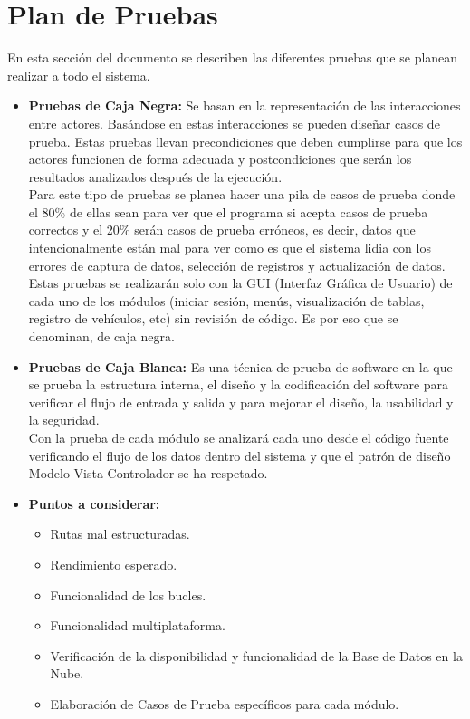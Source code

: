 \section{Plan de Pruebas}
En esta sección del documento se describen las diferentes pruebas que se planean realizar a todo el sistema.
\begin{itemize}
	\item \textbf{Pruebas de Caja Negra: } Se basan en la representación de las interacciones entre actores. Basándose en estas interacciones se pueden diseñar casos de prueba. Estas pruebas llevan precondiciones que deben cumplirse para que los actores funcionen de forma adecuada y postcondiciones que serán los resultados analizados después de la ejecución. \\
	Para este tipo de pruebas se planea hacer una pila de casos de prueba donde el 80\% de ellas sean para ver que el programa si acepta casos de prueba correctos y el 20\% serán casos de prueba erróneos, es decir, datos que intencionalmente están mal para ver como es que el sistema lidia con los errores de captura de datos, selección de registros y actualización de datos. Estas pruebas se realizarán solo con la GUI (Interfaz Gráfica de Usuario) de cada uno de los módulos (iniciar sesión, menús, visualización de tablas, registro de vehículos, etc) sin revisión de código. Es por eso que se denominan, de caja negra. 
	\item \textbf{Pruebas de Caja Blanca: } Es una técnica de prueba de software en la que se prueba la estructura interna, el diseño y la codificación del software para verificar el flujo de entrada y salida y para mejorar el diseño, la usabilidad y la seguridad. \\
	Con la prueba de cada módulo se analizará cada uno desde el código fuente verificando el flujo de los datos dentro del sistema y que el patrón de diseño Modelo Vista Controlador se ha respetado.
	\item \textbf{Puntos a considerar: }
	\begin{itemize}
		\item Rutas mal estructuradas.
		\item Rendimiento esperado.
		\item Funcionalidad de los bucles.
		\item Funcionalidad multiplataforma.
		\item Verificación de la disponibilidad y funcionalidad de la Base de Datos en la Nube.
		\item Elaboración de Casos de Prueba específicos para cada módulo.
	\end{itemize}
\end{itemize}